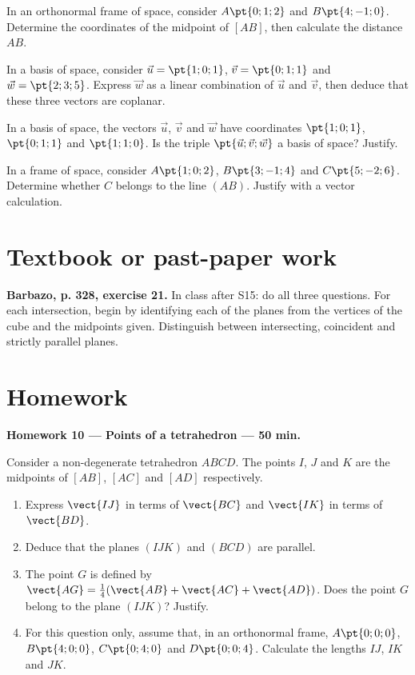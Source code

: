 In an orthonormal frame of space, consider $A\pt{0;1;2}$ and $B\pt{4;-1;0}$. Determine the coordinates of the midpoint of $[AB]$, then calculate the distance $AB$.

In a basis of space, consider $\vec u=\pt{1;0;1}$, $\vec v=\pt{0;1;1}$ and $\vec w=\pt{2;3;5}$. Express $\vec w$ as a linear combination of $\vec u$ and $\vec v$, then deduce that these three vectors are coplanar.

In a basis of space, the vectors $\vec u$, $\vec v$ and $\vec w$ have coordinates $\pt{1;0;1}$, $\pt{0;1;1}$ and $\pt{1;1;0}$. Is the triple $\pt{\vec u;\vec v;\vec w}$ a basis of space? Justify.

In a frame of space, consider $A\pt{1;0;2}$, $B\pt{3;-1;4}$ and $C\pt{5;-2;6}$. Determine whether $C$ belongs to the line $(AB)$. Justify with a vector calculation.


\section{Textbook or past-paper work}\textbf{Barbazo, p. 328, exercise 21.} In class after S15: do all three questions. For each intersection, begin by identifying each of the planes from the vertices of the cube and the midpoints given. Distinguish between intersecting, coincident and strictly parallel planes.

\mxnewpage
\section{Homework}\textbf{Homework 10 --- Points of a tetrahedron --- 50 min.}\par Consider a non-degenerate tetrahedron $ABCD$. The points $I$, $J$ and $K$ are the midpoints of $[AB]$, $[AC]$ and $[AD]$ respectively.
\begin{enumerate}\item Express $\vect{IJ}$ in terms of $\vect{BC}$ and $\vect{IK}$ in terms of $\vect{BD}$.
\item Deduce that the planes $(IJK)$ and $(BCD)$ are parallel.
\item The point $G$ is defined by $\vect{AG}=\frac14(\vect{AB}+\vect{AC}+\vect{AD})$. Does the point $G$ belong to the plane $(IJK)$? Justify.
\item For this question only, assume that, in an orthonormal frame, $A\pt{0;0;0}$, $B\pt{4;0;0}$, $C\pt{0;4;0}$ and $D\pt{0;0;4}$. Calculate the lengths $IJ$, $IK$ and $JK$.\end{enumerate}

